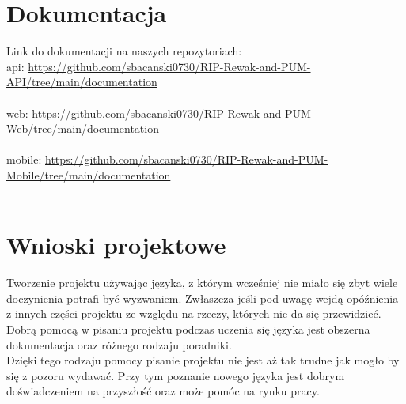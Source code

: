 \documentclass{article}
\begin{document}
\section{Dokumentacja}
Link do dokumentacji na naszych repozytoriach: \\
api: \url{https://github.com/sbacanski0730/RIP-Rewak-and-PUM-API/tree/main/documentation}\\\\
web: \url{https://github.com/sbacanski0730/RIP-Rewak-and-PUM-Web/tree/main/documentation}\\\\
mobile: \url{https://github.com/sbacanski0730/RIP-Rewak-and-PUM-Mobile/tree/main/documentation}\\\\

\section{Wnioski projektowe}

Tworzenie projektu używając języka, z którym wcześniej nie miało się zbyt wiele doczynienia potrafi być wyzwaniem. Zwłaszcza jeśli pod uwagę wejdą opóźnienia z innych części projektu ze względu na rzeczy, których nie da się przewidzieć.\\
Dobrą pomocą w pisaniu projektu podczas uczenia się języka jest obszerna dokumentacja oraz różnego rodzaju poradniki.\\
Dzięki tego rodzaju pomocy pisanie projektu nie jest aż tak trudne jak mogło by się z pozoru wydawać. Przy tym poznanie nowego języka jest dobrym doświadczeniem na przyszłość oraz może pomóc na rynku pracy.
\end{document}

